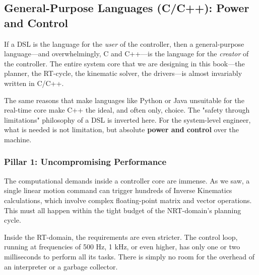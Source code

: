 

\subsection{General-Purpose Languages (C/C++): Power and Control}
\label{subsec:gpl_languages}

If a DSL is the language for the \textit{user} of the controller, then a general-purpose language—and overwhelmingly, C and C++—is the language for the \textit{creator} of the controller. The entire system core that we are designing in this book—the planner, the RT-cycle, the kinematic solver, the drivers—is almost invariably written in C/C++.

The same reasons that make languages like Python or Java unsuitable for the real-time core make C++ the ideal, and often only, choice. The "safety through limitations" philosophy of a DSL is inverted here. For the system-level engineer, what is needed is not limitation, but absolute \textbf{power and control} over the machine.

\subsubsection{Pillar 1: Uncompromising Performance}
\label{subsubsec:gpl_performance}

The computational demands inside a controller core are immense. As we saw, a single linear motion command can trigger hundreds of Inverse Kinematics calculations, which involve complex floating-point matrix and vector operations. This must all happen within the tight budget of the NRT-domain's planning cycle.

Inside the RT-domain, the requirements are even stricter. The control loop, running at frequencies of 500 Hz, 1 kHz, or even higher, has only one or two milliseconds to perform all its tasks. There is simply no room for the overhead of an interpreter or a garbage collector.

